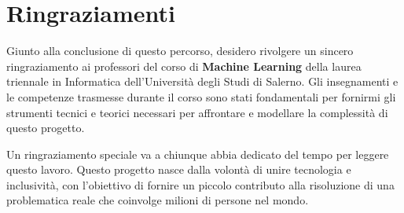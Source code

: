 \vspace{2cm}

\section*{Ringraziamenti}

Giunto alla conclusione di questo percorso, desidero rivolgere un sincero ringraziamento ai professori del corso di \textbf{Machine Learning} della laurea triennale in Informatica dell'Università degli Studi di Salerno. Gli insegnamenti e le competenze trasmesse durante il corso sono stati fondamentali per fornirmi gli strumenti tecnici e teorici necessari per affrontare e modellare la complessità di questo progetto.

Un ringraziamento speciale va a chiunque abbia dedicato del tempo per leggere questo lavoro. Questo progetto nasce dalla volontà di unire tecnologia e inclusività, con l'obiettivo di fornire un piccolo contributo alla risoluzione di una problematica reale che coinvolge milioni di persone nel mondo.
